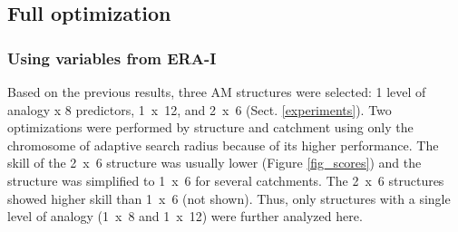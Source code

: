 \documentclass[draft]{agujournal2019}
\begin{document}
\subsection{Full optimization}
\label{best_multi}

\subsubsection{Using variables from ERA-I}

Based on the previous results, three AM structures were selected: 1 level of analogy x 8 predictors, 1~x~12, and 2~x~6 (Sect. \ref{experiments}). Two optimizations were performed by structure and catchment using only the chromosome of adaptive search radius because of its higher performance. The skill of the 2~x~6 structure was usually lower (Figure \ref{fig_scores}) and the structure was simplified to 1~x~6 for several catchments. The 2~x~6 structures showed higher skill than 1~x~6 (not shown). Thus, only structures with a single level of analogy (1~x~8 and 1~x~12) were further analyzed here. 
\end{document}

